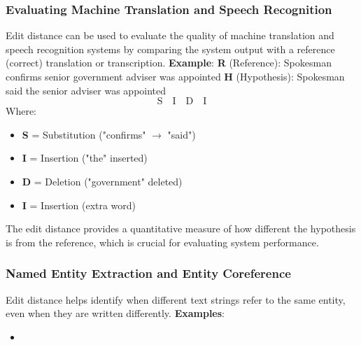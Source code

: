 \documentclass[a4paper]{article}
\theoremstyle{definition}
\begin{document}
\subsubsection{Evaluating Machine Translation and Speech Recognition}
Edit distance can be used to evaluate the quality of machine translation and speech recognition 
systems by comparing the system output with a reference (correct) translation or transcription.
\vspace{1em}
\noindent 
\newline
\textbf{Example}:
\vspace{1em}
\noindent 
\newline
\textbf{R} (Reference): Spokesman confirms senior government adviser was appointed 
\vspace{1em}
\noindent 
\newline
\textbf{H} (Hypothesis): Spokesman said the senior adviser was appointed 
\[
  \text{S} \quad \text{I} \quad \text{D} \quad \text{I}
\]
Where:
\begin{itemize}
  \item \textbf{S} = Substitution ("confirms" $\rightarrow$ "said")
  \item \textbf{I} = Insertion ("the" inserted)
  \item \textbf{D} = Deletion ("government" deleted)
  \item \textbf{I} = Insertion (extra word)
\end{itemize}
The edit distance provides a quantitative measure of how different the hypothesis is from the 
reference, which is crucial for evaluating system performance.
\subsubsection{Named Entity Extraction and Entity Coreference}
Edit distance helps identify when different text strings refer to the same entity, even when they 
are written differently.
\vspace{1em}
\noindent 
\newline
\textbf{Examples}:
\begin{itemize}
  \item
\end{itemize}
\end{document}
